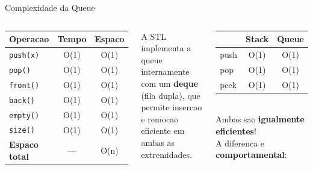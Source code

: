 \documentclass[aspectratio=169,11pt]{beamer}
\begin{document}
\begin{frame}{Complexidade da Queue}
  \begin{columns}[c]
      \begin{tcolorbox}[caixaAzul,title={Tabela de Complexidade}]
        \centering\small
        \begin{tabular}{lcc}
          \toprule
          \textbf{Operacao} & \textbf{Tempo} & \textbf{Espaco}\\
          \midrule
          \texttt{push(x)}  & O(1) & O(1)\\
          \texttt{pop()}    & O(1) & O(1)\\
          \texttt{front()}  & O(1) & O(1)\\
          \texttt{back()}   & O(1) & O(1)\\
          \texttt{empty()}  & O(1) & O(1)\\
          \texttt{size()}   & O(1) & O(1)\\
          \midrule
          \textbf{Espaco total} & --- & O(n)\\
          \bottomrule
        \end{tabular}
      \end{tcolorbox}
      \vspace{0.2cm}
      \begin{tcolorbox}[caixaVerde,title={Por que tudo e O(1)?}]
        \small
        A STL implementa a queue internamente com
        um \textbf{deque} (fila dupla), que permite
        insercao e remocao eficiente em ambas as extremidades.
      \end{tcolorbox}
      \begin{tcolorbox}[caixaAmarelo,title={Comparacao}]
        \small
        \begin{tabular}{lcc}
          \toprule
          & \textbf{Stack} & \textbf{Queue}\\
          \midrule
          push & O(1) & O(1)\\
          pop  & O(1) & O(1)\\
          peek & O(1) & O(1)\\
          \bottomrule
        \end{tabular}\\[6pt]
        Ambas sao \textbf{igualmente eficientes}!\\
        A diferenca e \textbf{comportamental}:\\

\end{tcolorbox}
\end{columns}
\end{frame}
\end{document}
